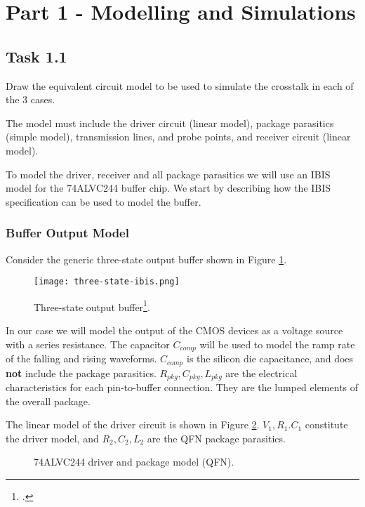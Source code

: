 \documentclass[../main.tex]{subfiles}
\begin{document}
\section{Part 1 - Modelling and Simulations}

\subsection{Task 1.1}

Draw the equivalent circuit model to be used to simulate the crosstalk in each of the 3 cases.

\vspace{10pt}
The model must include the driver circuit (linear model), package parasitics (simple model), transmission lines, and probe points, and receiver circuit (linear model).


To model the driver, receiver and all package parasitics we will use an IBIS model for the 74ALVC244 buffer chip. We start by describing how the IBIS specification can be used to model the buffer. 

\subsubsection{Buffer Output Model}

Consider the generic three-state output buffer shown in Figure \ref{fig:ibis-buffer}.

\begin{figure}[h]
    \centering
    \texttt{[image: three-state-ibis.png]}
    \caption{Three-state output buffer\footcite{ibis}.}
    \label{fig:ibis-buffer}
\end{figure}

In our case we will model the output of the CMOS devices as a voltage source with a series resistance. The capacitor $C_{comp}$ will be used to model the ramp rate of the falling and rising waveforms. $C_{comp}$ is the silicon die capacitance, and does \textbf{not} include the package parasitics. $R_{pkg}, C_{pkg}, L_{pkg}$ are the electrical characteristics for each pin-to-buffer connection. They are the lumped elements of the overall package.

\vspace{10pt}
The linear model of the driver circuit is shown in Figure \ref{fig:driver-package}. $V_1, R_1. C_1$ constitute the driver model, and $R_2, C_2, L_2$ are the QFN package parasitics.

\begin{figure}[h]
    \centering
    \caption{74ALVC244 driver and package model (QFN).}
    \label{fig:driver-package}
\end{figure}
\end{document}
